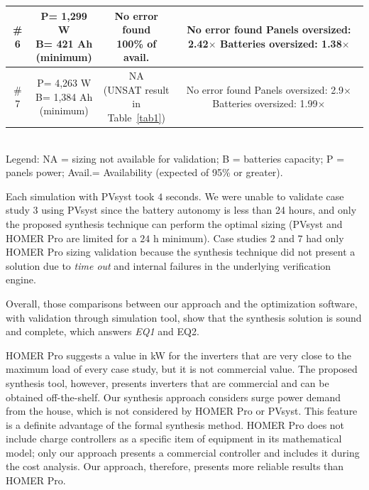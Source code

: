 \documentclass[journal]{IEEEtran}
\begin{document}
\begin{table}
\begin{scriptsize}
\begin{tabular}{c|c|c|c}
\hline
\# 6 & \makecell{P= 1,299 W\\B= 421 Ah\\(minimum)}&\makecell{No error found \\100\% of avail.} & \makecell{No error found\\Panels oversized: 2.42$\times$\\Batteries oversized: 1.38$\times$}\\
\hline
\# 7 & \makecell{P= 4,263 W\\B= 1,384 Ah\\(minimum)}&\makecell{NA \\(UNSAT result\\in Table~\ref{tab1})} & \makecell{No error found\\Panels oversized: 2.9$\times$\\Batteries oversized: 1.99$\times$}\\
\hline
\hline
\end{tabular}
\\Legend: NA = sizing not available for validation; B = batteries capacity; P = panels power; Avail.= Availability (expected of 95\% or greater).
\end{scriptsize}
\end{table}

Each simulation with PVsyst took $4$ seconds. We were unable to validate case study $3$ using PVsyst since the battery autonomy is less than 24 hours, and only the proposed synthesis technique can perform the optimal sizing (PVsyst and HOMER Pro are limited for a $24$ h minimum). Case studies $2$ and $7$ had only HOMER Pro sizing validation because the synthesis technique did not present a solution due to \textit{time out} and internal failures in the underlying verification engine. %

Overall, those comparisons between our approach and the optimization software, with validation through simulation tool, show that the synthesis solution is sound and complete, which answers \textit{EQ1} and {EQ2}.

HOMER Pro suggests a value in kW for the inverters that are very close to the maximum load of every case study, but it is not commercial value. The proposed synthesis tool, however, presents inverters that are commercial and can be obtained off-the-shelf. Our synthesis approach considers surge power demand from the house, which is not considered by HOMER Pro or PVsyst. This feature is a definite advantage of the formal synthesis method. HOMER Pro does not include charge controllers as a specific item of equipment in its mathematical model; only our approach presents a commercial controller and includes it during the cost analysis. Our approach, therefore, presents more reliable results than HOMER Pro.
\end{document}
